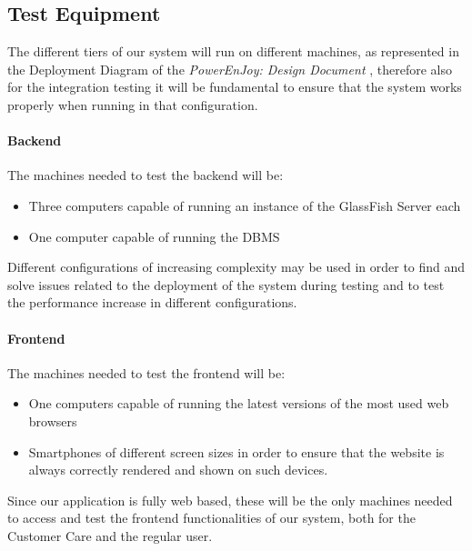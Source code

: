 \subsection{Test Equipment}
The different tiers of our system will run on different machines, as represented in the Deployment Diagram of the \emph{PowerEnJoy: Design Document} \cite{DD}, therefore also for the integration testing it will be fundamental to ensure that the system works properly when running in that configuration.
\paragraph{Backend}
The machines needed to test the backend will be:
\begin{itemize}
	\item Three computers capable of running an instance of the GlassFish Server each
	\item One computer capable of running the DBMS
\end{itemize}
Different configurations of increasing complexity may be used in order to find and solve issues related to the deployment of the system during testing and to test the performance increase in different configurations.
\paragraph{Frontend}
The machines needed to test the frontend will be:
\begin{itemize}
	\item One computers capable of running the latest versions of the most used web browsers
	\item Smartphones of different screen sizes in order to ensure that the website is always correctly rendered and shown on such devices.
\end{itemize}
Since our application is fully web based, these will be the only machines needed to access and test the frontend functionalities of our system, both for the Customer Care and the regular user.

